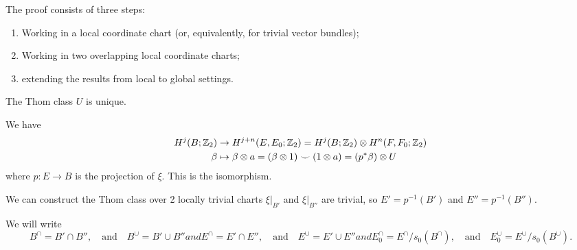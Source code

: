 
\lecture{}

\begin{node}
The proof consists of three steps:
\begin{enumerate}
\item Working in a local coordinate chart (or, equivalently, for
  trivial vector bundles);
\item Working in two overlapping local coordinate charts;
\item extending the results from local to global settings.
\end{enumerate}
\end{node}

\begin{claim}
The Thom class $U$ is unique.
\end{claim}

\begin{claim}
We have
\begin{align}
H^{j}(B;\mathbb{Z}_{2}) & \to H^{j+n}(E,E_{0};\mathbb{Z}_{2})=H^{j}(B;\mathbb{Z}_{2})\otimes H^{n}(F,F_{0};\mathbb{Z}_{2})\\
\beta & \mapsto\beta\otimes a=(\beta\otimes1)\smile(1\otimes a)=(p^{*}\beta)\otimes U\nonumber
\end{align}
where $p\colon E\to B$ is the projection of $\xi$. This is the isomorphism.
\end{claim}

\begin{claim}[Step 2]
We can construct the Thom class over 2 locally trivial charts
$\xi|_{B'}$ and $\xi|_{B''}$ are trivial, so $E'=p^{-1}(B')$ and $E''=p^{-1}(B'')$.
\end{claim}

\begin{node}
We will write
\begin{subequations}
\begin{equation}
B^{\cap} = B'\cap B'',\quad\mbox{and}\quad B^{\cup} = B'\cup B''
\end{equation}
and
\begin{equation}
E^{\cap} = E'\cap E'',\quad\mbox{and}\quad E^{\cup} = E'\cup E''
\end{equation}
and
\begin{equation}
E^{\cap}_{0}=E^{\cap}/s_{0}(B^{\cap}),\quad\mbox{and}\quad E^{\cup}_{0}=E^{\cup}/s_{0}(B^{\cup}).
\end{equation}
\end{subequations}
\end{node}

